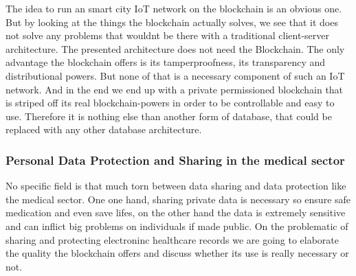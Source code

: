 The idea to run an smart city IoT network on the blockchain is an obvious one. But by looking at the things the blockchain actually solves, we see that it does not solve any problems that wouldnt be there with a traditional client-server architecture. The presented architecture does not need the Blockchain. The only advantage the blockchain offers is its tamperproofness, its transparency and distributional powers. But none of that is a necessary component of such an IoT network. And in the end we end up with a private permissioned blockchain that is striped off its real blockchain-powers in order to be controllable and easy to use. Therefore it is nothing else than another form of database, that could be replaced with any other database architecture.

\subsubsection{Personal Data Protection and Sharing in the medical sector}
No specific field is that much torn between data sharing and data protection like the medical sector. One one hand, sharing private data is necessary so ensure safe medication and even save lifes, on the other hand the data is extremely sensitive and can inflict big problems on individuals if made public. 
On the problematic of sharing and protecting electroninc healthcare records we are going to elaborate the quality the blockchain offers and discuss whether its use is really necessary or not.

